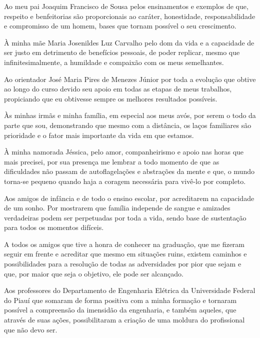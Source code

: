 Ao meu pai Joaquim Francisco de Sousa pelos ensinamentos e exemplos de que, respeito e benfeitorias são proporcionais ao caráter, honestidade, responsabilidade e compromisso de um homem, bases que tornam possível o seu crescimento.
    
À minha mãe Maria Josenildes Luz Carvalho pelo dom da vida e a capacidade de ser justo em detrimento de benefícios pessoais, de poder replicar, mesmo que infinitesimalmente, a humildade e compaixão com os meus semelhantes.
    
Ao orientador José Maria Pires de Menezes Júnior por toda a evolução que obtive ao longo do curso devido seu apoio em todas as etapas de meus trabalhos, propiciando que eu obtivesse sempre os melhores resultados possíveis.
    
Às minhas irmãs e minha família, em especial aos meus avós, por serem o todo da parte que sou, demonstrando que mesmo com a distância, os laços familiares são prioridade e o fator mais importante da vida em que estamos.
    
À minha namorada Jéssica, pelo amor, companheirismo e apoio nas horas que mais precisei, por sua presença me lembrar a todo momento de que as dificuldades não passam de autoflagelações e abstrações da mente e que, o mundo torna-se pequeno quando haja a coragem necessária para vivê-lo por completo.
    
Aos amigos de infância e de todo o ensino escolar, por acreditarem na capacidade de um sonho. Por mostrarem que família independe de sangue e amizades verdadeiras podem ser perpetuadas por toda a vida, sendo base de sustentação para todos os momentos difíceis.
    
A todos os amigos que tive a honra de conhecer na graduação, que me fizeram seguir em frente e acreditar que mesmo em situações ruins, existem caminhos e possibilidades para a resolução de todas as adversidades por pior que sejam e que, por maior que seja o objetivo, ele pode ser alcançado.
    
Aos professores do Departamento de Engenharia Elétrica da Universidade Federal do Piauí que somaram de forma positiva com a minha formação e tornaram possível a compreensão da imensidão da engenharia, e também aqueles, que através de suas ações, possibilitaram a criação de uma moldura do profissional que não devo ser.